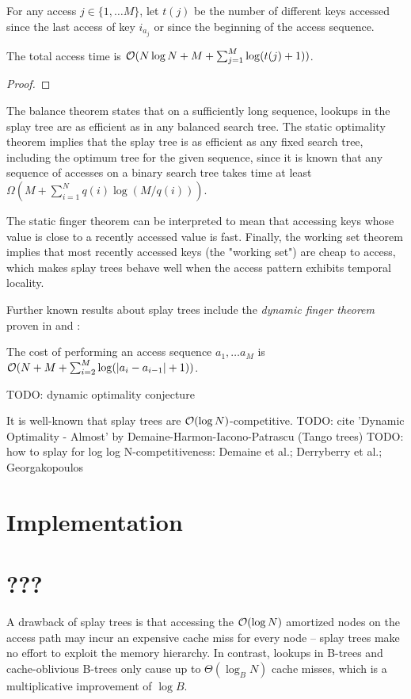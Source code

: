 For any access $j\in\{1,\ldots M\}$, let $t(j)$ be the number of different
keys accessed since the last access of key $i_{a_j}$ or since the
beginning of the access sequence.
\begin{theorem}
The total access time is $\mathcal{O}(N\log N + M + \sum_{j=1}^M\log(t(j)+1))$.
\end{theorem}
\begin{proof}
\end{proof}

The balance theorem states that on a sufficiently long sequence, lookups in
the splay tree are as efficient as in any balanced search tree. The static
optimality theorem implies that the splay tree is as efficient as any fixed
search tree, including the optimum tree for the given sequence, since
it is known that any sequence of accesses on a binary search tree
takes time at least $\Omega(M+\sum_{i=1}^N q(i)\log(M/q(i)))$.

The static finger theorem can be interpreted to mean that accessing keys
whose value is close to a recently accessed value is fast.
Finally, the working set theorem implies that most recently
accessed keys (the "working set") are cheap to access, which
makes splay trees behave well when the access pattern exhibits temporal
locality.

Further known results about splay trees include the \textit{dynamic finger
theorem} proven in \cite{dynamic-finger-1} and \cite{dynamic-finger-2}:
\begin{theorem}
The cost of performing an access sequence $a_1,\ldots a_M$ is
$\mathcal{O}(N+M+\sum_{i=2}^M \log(|a_i-a_{i-1}| + 1))$.
\end{theorem}

TODO: dynamic optimality conjecture

It is well-known that splay trees are $\mathcal{O}(\log N)$-competitive.
TODO: cite 'Dynamic Optimality - Almost' by Demaine-Harmon-Iacono-Patrascu
(Tango trees)
TODO: how to splay for log log N-competitiveness: Demaine et al.; Derryberry et
al.; Georgakopoulos


\section{Implementation}

\section{???}
A drawback of splay trees is that accessing the $\mathcal{O}(\log N)$ amortized
nodes on the access path may incur an expensive cache miss for every node --
splay trees make no effort to exploit the memory hierarchy.
In contrast, lookups in B-trees and cache-oblivious B-trees
only cause up to $\Theta(\log_B N)$ cache misses, which is a multiplicative
improvement of $\log B$.

